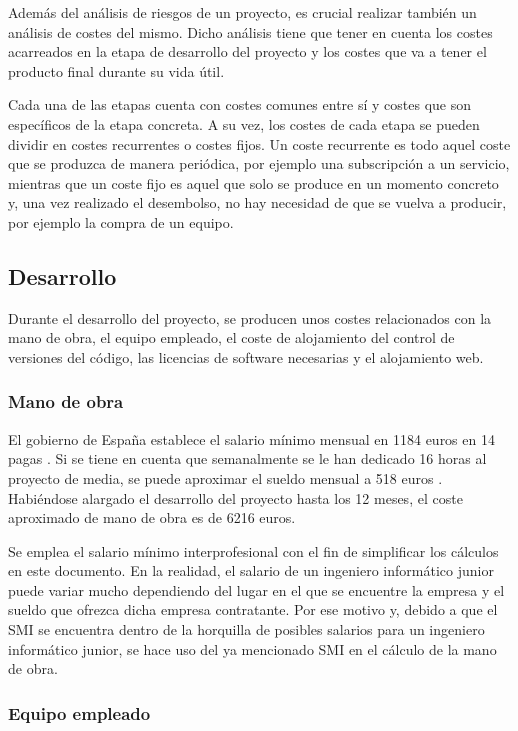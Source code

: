 Además del análisis de riesgos de un proyecto, es crucial realizar también un análisis de costes del mismo. Dicho análisis tiene que tener en cuenta los costes acarreados en la etapa de desarrollo del proyecto y los costes que va a tener el producto final durante su vida útil.

Cada una de las etapas cuenta con costes comunes entre sí y costes que son específicos de la etapa concreta. A su vez, los costes de cada etapa se pueden dividir en costes recurrentes o costes fijos. Un coste recurrente es todo aquel coste que se produzca de manera periódica, por ejemplo una subscripción a un servicio, mientras que un coste fijo es aquel que solo se produce en un momento concreto y, una vez realizado el desembolso, no hay necesidad de que se vuelva a producir, por ejemplo la compra de un equipo.

\subsection{Desarrollo}

Durante el desarrollo del proyecto, se producen unos costes relacionados con la mano de obra, el equipo empleado, el coste de alojamiento del control de versiones del código, las licencias de software necesarias y el alojamiento web.

\subsubsection{Mano de obra}

El gobierno de España establece el salario mínimo mensual en 1184 euros en 14 pagas \cite{salario}. Si se tiene en cuenta que semanalmente se le han dedicado 16 horas al proyecto de media, se puede aproximar el sueldo mensual a 518 euros \cite{salario12pagas}. Habiéndose alargado el desarrollo del proyecto hasta los 12 meses, el coste aproximado de mano de obra es de 6216 euros.

Se emplea el salario mínimo interprofesional con el fin de simplificar los cálculos en este documento. En la realidad, el salario de un ingeniero informático junior puede variar mucho dependiendo del lugar en el que se encuentre la empresa y el sueldo que ofrezca dicha empresa contratante. Por ese motivo y, debido a que el SMI se encuentra dentro de la horquilla de posibles salarios para un ingeniero informático junior, se hace uso del ya mencionado SMI en el cálculo de la mano de obra.

\subsubsection{Equipo empleado}

